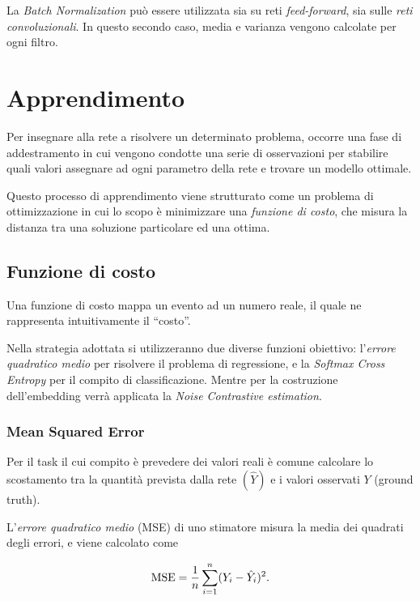 La \emph{Batch Normalization} può essere utilizzata sia su reti \emph{feed-forward}, sia sulle \emph{reti convoluzionali}.
In questo secondo caso, media e varianza vengono calcolate per ogni filtro.

\section{Apprendimento}
\label{sec:apprendimento}
Per insegnare alla rete a risolvere un determinato problema, occorre una fase di addestramento in cui vengono condotte una serie di osservazioni per stabilire quali valori assegnare ad ogni parametro della rete e trovare un modello ottimale.

Questo processo di apprendimento viene strutturato come un problema di ottimizzazione in cui lo scopo è minimizzare una \emph{funzione di costo}, che misura la distanza tra una soluzione particolare ed una ottima. 

\subsection{Funzione di costo}
\label{subsec:loss}

Una funzione di costo mappa un evento ad un numero reale, il quale ne rappresenta intuitivamente il ``costo''.

Nella strategia adottata si utilizzeranno due diverse funzioni obiettivo: l'\emph{errore quadratico medio} per risolvere il problema di regressione, e la \emph{Softmax Cross Entropy} per il compito di classificazione. Mentre per la costruzione dell'embedding verrà applicata la \emph{Noise Contrastive estimation}.

\subsubsection{Mean Squared Error}
\label{subsubsec:MSE}

Per il task il cui compito è prevedere dei valori reali è comune calcolare lo scostamento tra la quantità prevista dalla rete $(\hat{Y})$ e i valori osservati $Y$ (ground truth). 
 
L'\emph{errore quadratico medio} (MSE) di uno stimatore misura la media dei quadrati degli errori, e viene calcolato come

\begin{equation}
\operatorname{MSE} = \frac{1}{n}\sum_{i=1}^{n}(Y_i-\hat{Y}_i)^2 \mbox{.}
\end{equation}

